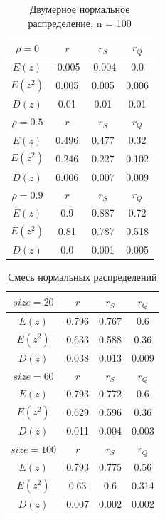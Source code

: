 	
	
	\begin{table}[H]
		\centering
		\begin{tabular}{| c | c | c | c |}
			
			\hline
			$\rho = 0$ & $r$      & $r_S$  & $r_Q$ \\
			\hline
			$E(z)$    & -0.005 & -0.004 & 0.0   \\
			$E(z^2)$  & 0.005  & 0.005  & 0.006 \\
			$D(z)$    & 0.01   & 0.01   & 0.01  \\
			\hline
			$\rho = 0.5$ & $r$      & $r_S$  & $r_Q$ \\
			\hline
			$E(z)$    & 0.496 & 0.477 & 0.32  \\
			$E(z^2)$    & 0.246 & 0.227 & 0.102 \\
			$D(z)$      & 0.006 & 0.007 & 0.009 \\
			\hline
			$\rho = 0.9$ & $r$      & $r_S$  & $r_Q$ \\
			\hline
			$E(z)$    & 0.9  & 0.887 & 0.72  \\
			$E(z^2)$    & 0.81 & 0.787 & 0.518 \\
			$D(z)$      & 0.0  & 0.001 & 0.005 \\
			\hline
			
		\end{tabular}{}
		\caption{Двумерное нормальное распределение, n = 100}
		\label{tab:n100}
	\end{table}
	
	
	\begin{table}[H]
		\centering
		\begin{tabular}{| c | c | c | c |}
			
			\hline
			$size = 20$ & $r$      & $r_{S}$ & $r_{Q}$ \\
			\hline
			$E(z)$    & 0.796 & 0.767 & 0.6   \\
			$E(z^2)$    & 0.633 & 0.588 & 0.36  \\
			$D(z)$      & 0.038 & 0.013 & 0.009 \\
			\hline
			$size = 60$ & $r$      & $r_{S}$ & $r_{Q}$ \\
			\hline
			$E(z)$    & 0.793 & 0.772 & 0.6   \\
			$E(z^2)$    & 0.629 & 0.596 & 0.36  \\
			$D(z)$      & 0.011 & 0.004 & 0.003 \\
			\hline
			$size = 100$ & $r$      & $r_{S}$ & $r_{Q}$ \\
			\hline
			$E(z)$    & 0.793 & 0.775 & 0.56  \\
			$E(z^2)$     & 0.63  & 0.6   & 0.314 \\
			$D(z)$       & 0.007 & 0.002 & 0.002 \\
			\hline
			
		\end{tabular}{}
		\caption{Смесь нормальных распределений}
		\label{tab:mix_normal}
	\end{table}
	
